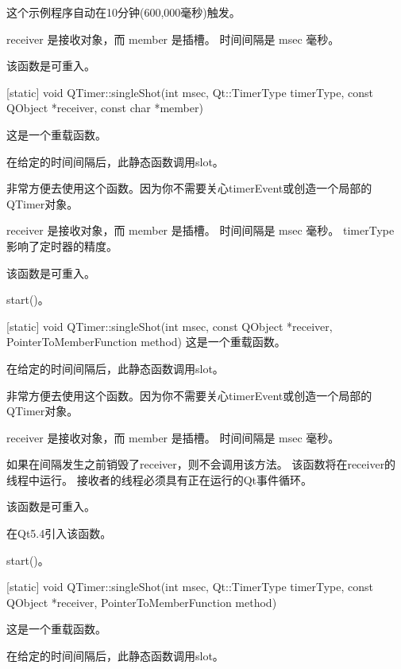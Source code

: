 
这个示例程序自动在10分钟(600,000毫秒)触发。

receiver 是接收对象，而 member 是插槽。 时间间隔是 msec 毫秒。

\begin{notice}
该函数是可重入。
\end{notice}

[static] void QTimer::singleShot(int msec, Qt::TimerType timerType, const QObject *receiver, const char *member)

这是一个重载函数。

在给定的时间间隔后，此静态函数调用slot。

非常方便去使用这个函数。因为你不需要关心timerEvent或创造一个局部的QTimer对象。

receiver 是接收对象，而 member 是插槽。 时间间隔是 msec 毫秒。 timerType 影响了定时器的精度。

\begin{notice}
该函数是可重入。
\end{notice}

\begin{notice}[另请参阅]
start()。
\end{notice}


[static] void QTimer::singleShot(int msec, const QObject *receiver, PointerToMemberFunction method)
这是一个重载函数。

在给定的时间间隔后，此静态函数调用slot。

非常方便去使用这个函数。因为你不需要关心timerEvent或创造一个局部的QTimer对象。

receiver 是接收对象，而 member 是插槽。 时间间隔是 msec 毫秒。

如果在间隔发生之前销毁了receiver，则不会调用该方法。 该函数将在receiver的线程中运行。 接收者的线程必须具有正在运行的Qt事件循环。


\begin{notice}
该函数是可重入。
\end{notice}

在Qt5.4引入该函数。

\begin{notice}[另请参阅]
start()。
\end{notice}

[static] void QTimer::singleShot(int msec, Qt::TimerType timerType, const QObject *receiver, PointerToMemberFunction method)

这是一个重载函数。

在给定的时间间隔后，此静态函数调用slot。


